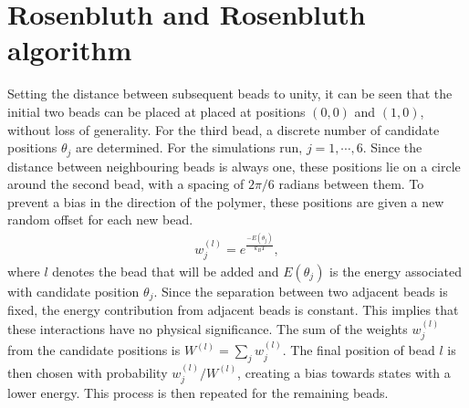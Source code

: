 \section{Rosenbluth and Rosenbluth algorithm}
Setting the distance between subsequent beads to unity, it can be seen that the initial two beads can be placed at placed at positions $(0,0)$ and $(1,0)$, without loss of generality. For the third bead, a discrete number of candidate positions $\theta_j$ are determined. For the simulations run, $j=1,\cdots,6$. Since the distance between neighbouring beads is always one, these positions lie on a circle around the second bead, with a spacing of $2\pi/6$ radians between them. To prevent a bias in the direction of the polymer, these positions are given a new random offset for each new bead.
\begin{gather}
    w_j^{(l)} = e^\frac{-E(\theta_j)}{k_BT},
\end{gather} where $l$ denotes the bead that will be added and $E(\theta_j)$ is the energy associated with candidate position $\theta_j$. Since the separation between two adjacent beads is fixed, the energy contribution from adjacent beads is constant. This implies that these interactions have no physical significance. The sum of the weights $w_j^{(l)}$ from the candidate positions is $W^{(l)} = \sum_j w_j^{(l)}$. The final position of bead $l$ is then chosen with probability $w_j^{(l)}/W^{(l)}$, creating a bias towards states with a lower energy. This process is then repeated for the remaining beads.
